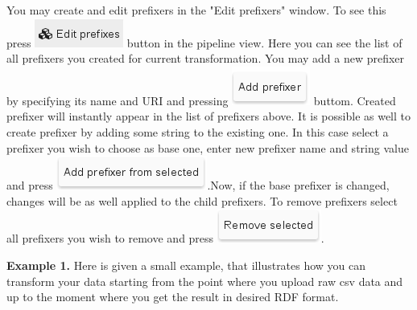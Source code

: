 \documentclass[USenglish]{article}
\begin{document}
You may create and edit prefixers in the "Edit prefixers" window. To see this press {\includegraphics[scale=0.5]{editprefixers.png}} button in the pipeline view. Here you can see the list of all prefixers you created for current transformation. You may add a new prefixer by specifying its name and URI and pressing {\includegraphics[scale=0.5]{addprefixer.png}} buttom. Created prefixer will instantly appear in the list of prefixers above. It is possible as well to create prefixer by adding some string to the existing one. In this case select a prefixer you wish to choose as base one, enter new prefixer name and string value and press  {\includegraphics[scale=0.5]{addprefixerfrom.png}}.Now, if the base prefixer is changed, changes will be as well applied to the child prefixers. To remove prefixers select all prefixers you wish to remove and press  {\includegraphics[scale=0.5]{removeprefixers.png}}.


\begin{mdframed}[hidealllines=true,backgroundcolor=gray!10]
\textbf{Example 1.}
Here is given a small example, that illustrates how you can transform your data starting from the point where you upload raw csv data and up to the moment where you get the result in desired RDF format.
\end{mdframed}
\end{document}
